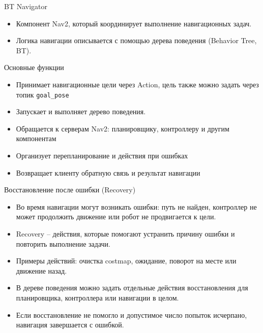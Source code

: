 \documentclass[aspectratio=169]{beamer}
\newcommand{\term}[1]{{\textcolor{HSEblue}{#1}}}
\newcommand{\cmd}[1]{\textcolor{HSEblue}{\texttt{#1}}}
\begin{document}
\begin{frame}{BT Navigator}
  \small
  \begin{itemize}
    \item Компонент Nav2, который
          координирует выполнение навигационных задач.
    \item Логика навигации описывается с помощью
          \term{дерева поведения} (Behavior Tree, BT).
  \end{itemize}

  \begin{block}{Основные функции}
    \begin{itemize}
  \item Принимает навигационные цели через Action,
      цель также можно задать через топик \cmd{goal\_pose}
      \item Запускает и выполняет дерево поведения.
      \item Обращается к серверам Nav2:
            планировщику, контроллеру и другим компонентам
      \item Организует перепланирование и действия при ошибках
      \item Возвращает клиенту обратную связь и результат навигации
    \end{itemize}
  \end{block}
\end{frame}



\begin{frame}{Восстановление после ошибки (Recovery)}

  \begin{itemize}
    \item Во время навигации могут возникать ошибки: путь не найден, контроллер не может продолжить движение или робот не продвигается к цели.
    \item \term{Recovery} -- действия, которые помогают устранить причину ошибки и повторить выполнение задачи.
    \item Примеры действий: очистка costmap, ожидание, поворот на месте или движение назад.
    \item В дереве поведения можно задать отдельные действия восстановления для планировщика, контроллера или навигации в целом.
    \item Если восстановление не помогло и допустимое число попыток исчерпано, навигация завершается с ошибкой.
  \end{itemize}

\end{frame}
\end{document}
